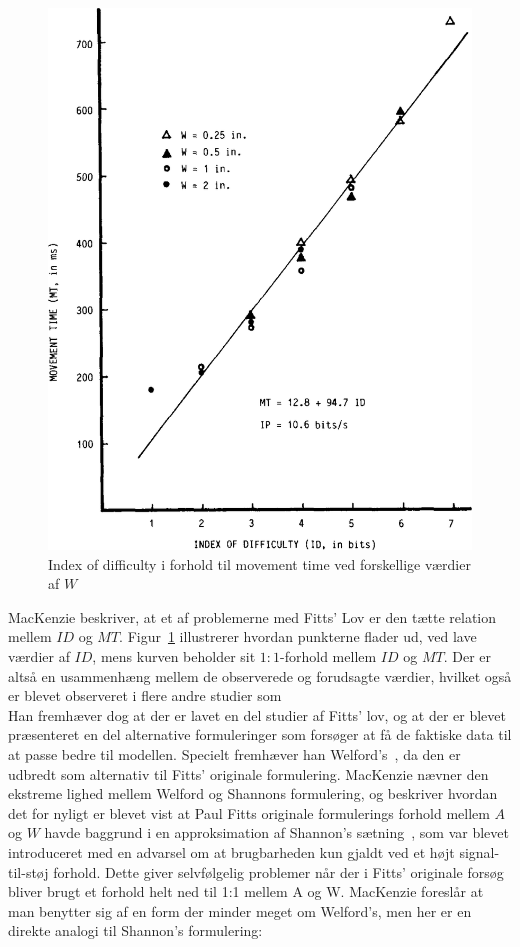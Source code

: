 \begin{figure}[h]
\centering
\includegraphics[scale=0.5]{images/illustrations/mackenzie_plot_1}
\caption{Index of difficulty i forhold til movement time ved forskellige værdier af $W$}
\label{fig:MacKenziePlot1}
\end{figure}
MacKenzie beskriver, at et af problemerne med Fitts' Lov er den tætte relation mellem $ID$ og $MT$. Figur~\ref{fig:MacKenziePlot1} illustrerer hvordan punkterne flader ud, ved lave værdier af $ID$, mens kurven beholder sit $1:1$-forhold mellem $ID$ og $MT$. Der er altså en usammenhæng mellem de observerede og forudsagte værdier, hvilket også er blevet observeret i flere andre studier som \cite{welford1960, buck1986, crossman1983, drury1975, klapp1975, langolf1976, meyer1988, wallace1978}\\
Han fremhæver dog at der er lavet en del studier af Fitts' lov, og at der er blevet præsenteret en del alternative formuleringer som forsøger at få de faktiske data til at passe bedre til modellen. Specielt fremhæver han Welford's~\cite{welford1960,welford1968}, da den er udbredt som alternativ til Fitts' originale formulering. MacKenzie nævner den ekstreme lighed mellem Welford og Shannons formulering, og beskriver hvordan det for nyligt er blevet vist at Paul Fitts originale formulerings forhold mellem $A$ og $W$ havde baggrund i en approksimation af Shannon's sætning~\cite[p. 388]{fitts1954}, som var blevet introduceret med en advarsel om at brugbarheden kun gjaldt ved et højt signal-til-støj forhold. Dette giver selvfølgelig problemer når der i Fitts' originale forsøg bliver brugt et forhold helt ned til 1:1 mellem A og W. MacKenzie foreslår at man benytter sig af en form der minder meget om Welford's, men her er en direkte analogi til Shannon's formulering:
